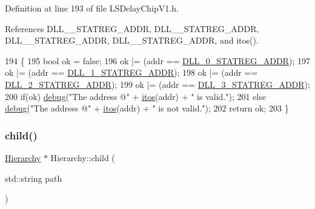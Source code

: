Definition at line 193 of file L\+S\+Delay\+Chip\+V1.\+h.



References D\+L\+L\+\_\+\_\+\+S\+T\+A\+T\+R\+E\+G\+\_\+\+A\+D\+DR, D\+L\+L\+\_\+\_\+\+S\+T\+A\+T\+R\+E\+G\+\_\+\+A\+D\+DR, D\+L\+L\+\_\+\_\+\+S\+T\+A\+T\+R\+E\+G\+\_\+\+A\+D\+DR, D\+L\+L\+\_\+\_\+\+S\+T\+A\+T\+R\+E\+G\+\_\+\+A\+D\+DR, and itos().


\begin{DoxyCode}
194     \{
195          \textcolor{keywordtype}{bool} ok = \textcolor{keyword}{false};  
196          ok |= (addr == \hyperlink{LSDelayChipV1_8h_adca5cc0cd52b4fe9328f3471b0b9c613}{DLL\_0\_STATREG\_ADDR}); 
197          ok |= (addr == \hyperlink{LSDelayChipV1_8h_a39e2f4a0151fcdf29a28e917154fa039}{DLL\_1\_STATREG\_ADDR});
198          ok |= (addr == \hyperlink{LSDelayChipV1_8h_a11ad4f0e8a466fc2da33308f351b9054}{DLL\_2\_STATREG\_ADDR});
199          ok |= (addr == \hyperlink{LSDelayChipV1_8h_ad23a65fd56cf8a5ba711228025ab5e48}{DLL\_3\_STATREG\_ADDR});  
200          \textcolor{keywordflow}{if}(ok) \hyperlink{classObject_aac010553f022165573714b7014a15f0d}{debug}(\textcolor{stringliteral}{"The address @"} + \hyperlink{Tools_8h_af330027dbdafb9a30768b3613c553e60}{itos}(addr) + \textcolor{stringliteral}{" is valid."});
201          \textcolor{keywordflow}{else}   \hyperlink{classObject_aac010553f022165573714b7014a15f0d}{debug}(\textcolor{stringliteral}{"The address @"} + \hyperlink{Tools_8h_af330027dbdafb9a30768b3613c553e60}{itos}(addr) + \textcolor{stringliteral}{" is not valid."});         
202          \textcolor{keywordflow}{return} ok;           
203     \}
\end{DoxyCode}
\mbox{\label{classHierarchy_a1e207f973c694b538bf90107b4868817}} 
\subsubsection{\texorpdfstring{child()}{child()}}
{\footnotesize\ttfamily \hyperlink{classHierarchy}{Hierarchy} $\ast$ Hierarchy\+::child (\begin{DoxyParamCaption}\item[{std\+::string}]{path }\end{DoxyParamCaption})\hspace{0.3cm}{\ttfamily [inherited]}}



